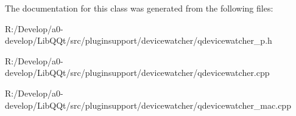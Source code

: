 The documentation for this class was generated from the following files\+:\begin{DoxyCompactItemize}
\item 
R\+:/\+Develop/a0-\/develop/\+Lib\+Q\+Qt/src/pluginsupport/devicewatcher/qdevicewatcher\+\_\+p.\+h\item 
R\+:/\+Develop/a0-\/develop/\+Lib\+Q\+Qt/src/pluginsupport/devicewatcher/qdevicewatcher.\+cpp\item 
R\+:/\+Develop/a0-\/develop/\+Lib\+Q\+Qt/src/pluginsupport/devicewatcher/qdevicewatcher\+\_\+mac.\+cpp\end{DoxyCompactItemize}
